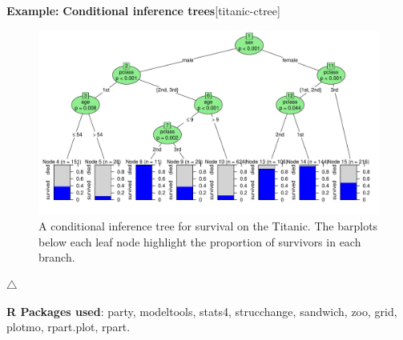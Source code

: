 \documentclass{article}
\newenvironment{knitrout}{}{} %
\let\proglang=\textsf
\newcommand{\R}{\proglang{R}\xspace}
\newenvironment{Example}[2][unnamed-example]%
  {\medskip\noindent\textbf{\textsf{Example:}}
   \textbf{#2}\hfill [#1]\par\smallskip
  }
  {\hfill $\triangle$}
\begin{document}
\begin{Example}[titanic-ctree]{Conditional inference trees}
\begin{knitrout}
\begin{figure}[hbt!]
{\centering \includegraphics[width=\linewidth]{figure/titanic-ctree} 

}

\caption[A conditional inference tree for survival on the Titanic]{A conditional inference tree for survival on the Titanic. The barplots below each leaf node highlight the proportion of survivors in each branch.\label{fig:titanic-ctree}}
\end{figure}


\end{knitrout}

\end{Example}







\bigskip\noindent
\textbf{\R Packages used}: party, modeltools, stats4, strucchange, sandwich, zoo, grid, plotmo, rpart.plot, rpart.
\end{document}
